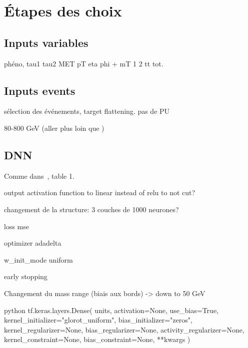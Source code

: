 
\section*{Étapes des choix}
\subsection*{Inputs variables}
phéno, tau1 tau2 MET pT eta phi + mT 1 2 tt tot.
\subsection*{Inputs events}
sélection des événements, target flattening. pas de PU

80-800 GeV (aller plus loin que \cite{BARTSCHI201929})
\subsection*{DNN}



Comme dans~\cite{BARTSCHI201929}, table 1.

output activation function to linear instead of relu to not cut?

changement de la structure: 3 couches de 1000 neurones?

loss mse

optimizer adadelta

w\_init\_mode uniform

early stopping

Changement du mass range (biais aux bords) -> down to 50 GeV


\begin{code}{python}
tf.keras.layers.Dense(
    units,
    activation=None,
    use_bias=True,
    kernel_initializer="glorot_uniform",
    bias_initializer="zeros",
    kernel_regularizer=None,
    bias_regularizer=None,
    activity_regularizer=None,
    kernel_constraint=None,
    bias_constraint=None,
    **kwargs
)
\end{code}

